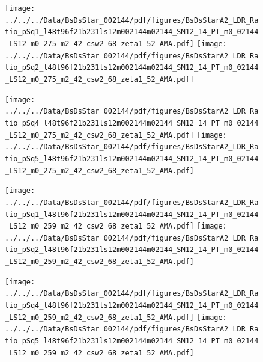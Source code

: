 \documentclass[a4paper,10pt]{article}
\begin{document}
\begin{figure}[p]
 \texttt{[image: ../../../Data/BsDsStar\_002144/pdf/figures/BsDsStarA2\_LDR\_Ratio\_pSq1\_l48t96f21b231ls12m002144m02144\_SM12\_14\_PT\_m0\_02144\_LS12\_m0\_275\_m2\_42\_csw2\_68\_zeta1\_52\_AMA.pdf]} 
 \texttt{[image: ../../../Data/BsDsStar\_002144/pdf/figures/BsDsStarA2\_LDR\_Ratio\_pSq2\_l48t96f21b231ls12m002144m02144\_SM12\_14\_PT\_m0\_02144\_LS12\_m0\_275\_m2\_42\_csw2\_68\_zeta1\_52\_AMA.pdf]} 
 \end{figure}
\begin{figure}[p]
 \texttt{[image: ../../../Data/BsDsStar\_002144/pdf/figures/BsDsStarA2\_LDR\_Ratio\_pSq4\_l48t96f21b231ls12m002144m02144\_SM12\_14\_PT\_m0\_02144\_LS12\_m0\_275\_m2\_42\_csw2\_68\_zeta1\_52\_AMA.pdf]} 
 \texttt{[image: ../../../Data/BsDsStar\_002144/pdf/figures/BsDsStarA2\_LDR\_Ratio\_pSq5\_l48t96f21b231ls12m002144m02144\_SM12\_14\_PT\_m0\_02144\_LS12\_m0\_275\_m2\_42\_csw2\_68\_zeta1\_52\_AMA.pdf]} 
 \end{figure}
\begin{figure}[p]
 \texttt{[image: ../../../Data/BsDsStar\_002144/pdf/figures/BsDsStarA2\_LDR\_Ratio\_pSq1\_l48t96f21b231ls12m002144m02144\_SM12\_14\_PT\_m0\_02144\_LS12\_m0\_259\_m2\_42\_csw2\_68\_zeta1\_52\_AMA.pdf]} 
 \texttt{[image: ../../../Data/BsDsStar\_002144/pdf/figures/BsDsStarA2\_LDR\_Ratio\_pSq2\_l48t96f21b231ls12m002144m02144\_SM12\_14\_PT\_m0\_02144\_LS12\_m0\_259\_m2\_42\_csw2\_68\_zeta1\_52\_AMA.pdf]} 
 \end{figure}
\clearpage
\begin{figure}[p]
 \texttt{[image: ../../../Data/BsDsStar\_002144/pdf/figures/BsDsStarA2\_LDR\_Ratio\_pSq4\_l48t96f21b231ls12m002144m02144\_SM12\_14\_PT\_m0\_02144\_LS12\_m0\_259\_m2\_42\_csw2\_68\_zeta1\_52\_AMA.pdf]} 
 \texttt{[image: ../../../Data/BsDsStar\_002144/pdf/figures/BsDsStarA2\_LDR\_Ratio\_pSq5\_l48t96f21b231ls12m002144m02144\_SM12\_14\_PT\_m0\_02144\_LS12\_m0\_259\_m2\_42\_csw2\_68\_zeta1\_52\_AMA.pdf]} 
 \end{figure}
\clearpage
\end{document}
